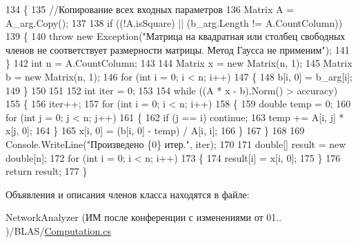 \begin{DoxyCode}
134         \{
135             \textcolor{comment}{//Копирование всех входных параметров}
136             Matrix A = A\_arg.Copy();
137 
138             \textcolor{keywordflow}{if} ((!A.isSquare) || (b\_arg.Length != A.CountColumn))
139             \{
140                 \textcolor{keywordflow}{throw} \textcolor{keyword}{new} Exception(\textcolor{stringliteral}{"Матрица на квадратная или столбец свободных членов не соответствует
       размерности матрицы. Метод Гаусса не применим"});
141             \}
142             \textcolor{keywordtype}{int} n = A.CountColumn;
143 
144             Matrix x = \textcolor{keyword}{new} Matrix(n, 1);
145             Matrix b = \textcolor{keyword}{new} Matrix(n, 1);
146             \textcolor{keywordflow}{for} (\textcolor{keywordtype}{int} i = 0; i < n; i++)
147             \{
148                 b[i, 0] = b\_arg[i];
149             \}
150 
151 
152             \textcolor{keywordtype}{int} iter = 0;
153 
154             \textcolor{keywordflow}{while} ((A * x - b).Norm() > accuracy)
155             \{
156                 iter++;
157                 \textcolor{keywordflow}{for} (\textcolor{keywordtype}{int} i = 0; i < n; i++)
158                 \{
159                     \textcolor{keywordtype}{double} temp = 0;
160                     \textcolor{keywordflow}{for} (\textcolor{keywordtype}{int} j = 0; j < n; j++)
161                     \{
162                         \textcolor{keywordflow}{if} (j == i) \textcolor{keywordflow}{continue};
163                         temp += A[i, j] * x[j, 0];
164                     \}
165                     x[i, 0] = (b[i, 0] - temp) / A[i, i];
166                 \}
167             \}
168 
169             Console.WriteLine(\textcolor{stringliteral}{"Произведено \{0\} итер."}, iter);
170 
171             \textcolor{keywordtype}{double}[] result = \textcolor{keyword}{new} \textcolor{keywordtype}{double}[n];
172             \textcolor{keywordflow}{for} (\textcolor{keywordtype}{int} i = 0; i < n; i++)
173             \{
174                 result[i] = x[i, 0];
175             \}
176             \textcolor{keywordflow}{return} result;
177         \}
\end{DoxyCode}


Объявления и описания членов класса находятся в файле\+:\begin{DoxyCompactItemize}
\item 
Network\+Analyzer (ИМ после конференции  с изменениями от 01.. )/\+B\+L\+A\+S/\hyperlink{_computation_8cs}{Computation.\+cs}\end{DoxyCompactItemize}
